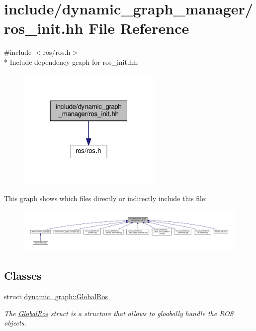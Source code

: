\hypertarget{ros__init_8hh}{}\section{include/dynamic\+\_\+graph\+\_\+manager/ros\+\_\+init.hh File Reference}
\label{ros__init_8hh}
{\ttfamily \#include $<$ros/ros.\+h$>$}\\*
Include dependency graph for ros\+\_\+init.\+hh\+:
\nopagebreak
\begin{figure}[H]
\begin{center}
\leavevmode
\includegraphics[width=196pt]{ros__init_8hh__incl}
\end{center}
\end{figure}
This graph shows which files directly or indirectly include this file\+:
\nopagebreak
\begin{figure}[H]
\begin{center}
\leavevmode
\includegraphics[width=350pt]{ros__init_8hh__dep__incl}
\end{center}
\end{figure}
\subsection*{Classes}
\begin{DoxyCompactItemize}
\item 
struct \hyperlink{structdynamic__graph_1_1GlobalRos}{dynamic\+\_\+graph\+::\+Global\+Ros}
\begin{DoxyCompactList}\small\item\em The \hyperlink{structdynamic__graph_1_1GlobalRos}{Global\+Ros} struct is a structure that allows to gloabally handle the R\+OS objects. \end{DoxyCompactList}\end{DoxyCompactItemize}

